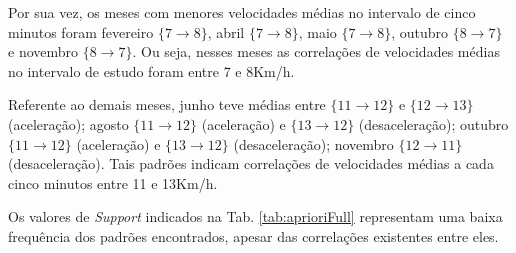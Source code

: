 \documentclass[
	12pt,				%
	oneside,			%
	a4paper,			%
	english,			%
	brazil				%
	]{abntex2ppgsi}
\begin{document}
{{Por sua vez, os meses com menores velocidades médias no intervalo de cinco minutos foram fevereiro $\lbrace 7 \rightarrow 8\rbrace$, abril $\lbrace 7 \rightarrow 8 \rbrace$, maio $\lbrace7 \rightarrow 8\rbrace$, outubro $\lbrace8 \rightarrow 7\rbrace$ e novembro $\lbrace8 \rightarrow 7\rbrace$. Ou seja, nesses meses as correlações de velocidades médias no intervalo de estudo foram entre 7 e 8Km/h.

Referente ao demais meses, junho teve médias entre $\lbrace11 \rightarrow 12\rbrace$ e $\lbrace12 \rightarrow 13\rbrace$ (aceleração); agosto $\lbrace11 \rightarrow 12\rbrace$ (aceleração) e $\lbrace13 \rightarrow 12\rbrace$  (desaceleração); outubro $\lbrace11 \rightarrow 12\rbrace$ (aceleração) e $\lbrace13 \rightarrow 12\rbrace$ (desaceleração); novembro $\lbrace12 \rightarrow 11\rbrace$ (desaceleração). Tais padrões indicam correlações de velocidades médias a cada cinco minutos entre 11 e 13Km/h.

Os valores de \textit{Support} indicados na Tab. \ref{tab:aprioriFull} representam uma baixa frequência dos padrões encontrados, apesar das correlações existentes entre eles. 

}}
\end{document}
